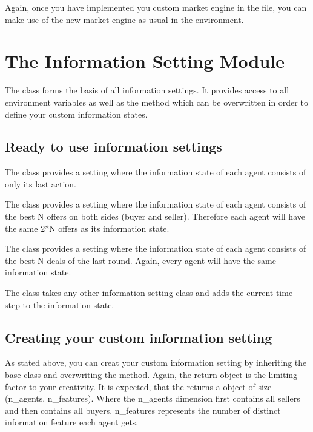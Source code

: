 \documentclass[letterpaper,10pt,english]{sphinxmanual}
\begin{document}
\sphinxAtStartPar
Again, once you have implemented you custom market engine in the  file, you can make use of the new market
engine as usual in the environment.


\section{The Information Setting Module}
\label{\detokenize{MultiAgentMarketRL:the-information-setting-module}}
\sphinxAtStartPar
The  class forms the basis of all information settings. It provides access to all environment
variables as well as the  method which can be overwritten in order to define your custom information
states.


\subsection{Ready to use information settings}
\label{\detokenize{MultiAgentMarketRL:ready-to-use-information-settings}}
\sphinxAtStartPar
The  class provides a setting where the information state of each agent consists of only its last
action.

\sphinxAtStartPar
The  class provides a setting where the information state of each agent consists of the best
N offers on both sides (buyer and seller). Therefore each agent will have the same 2*N offers as its information state.

\sphinxAtStartPar
The  class provides a setting where the information state of each agent consists of the best
N deals of the last round. Again, every agent will have the same information state.

\sphinxAtStartPar
The  class takes any other information setting class and adds the current time step to the
information state.


\subsection{Creating your custom information setting}
\label{\detokenize{MultiAgentMarketRL:creating-your-custom-information-setting}}
\sphinxAtStartPar
As stated above, you can creat your custom information setting by inheriting the  base class and
overwriting the  method. Again, the return object is the limiting factor to your creativity. It is
expected, that the  returns a  object of size (n\_agents, n\_features). Where the
n\_agents dimension first contains all sellers and then contains all buyers. n\_features represents the number of
distinct information feature each agent gets.
\end{document}

